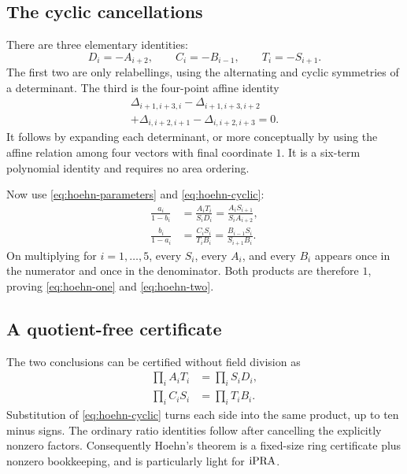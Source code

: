 \subsection{The cyclic cancellations}

There are three elementary identities:
\begin{equation}\label{eq:hoehn-cyclic}
 D_i=-A_{i+2},
 \qquad C_i=-B_{i-1},
 \qquad T_i=-S_{i+1}.
\end{equation}
The first two are only relabellings, using the alternating and cyclic
symmetries of a determinant.  The third is the four-point affine identity
\begin{multline*}
 \Delta_{i+1,i+3,i}-\Delta_{i+1,i+3,i+2}\\
 +\Delta_{i,i+2,i+1}-\Delta_{i,i+2,i+3}=0.
\end{multline*}
It follows by expanding each determinant, or more conceptually by using the
affine relation among four vectors with final coordinate $1$.  It is a
six-term polynomial identity and requires no area ordering.

Now use \eqref{eq:hoehn-parameters} and \eqref{eq:hoehn-cyclic}:
\begin{align*}
 \frac{a_i}{1-b_i}
 &=\frac{A_iT_i}{S_iD_i}
 =\frac{A_iS_{i+1}}{S_iA_{i+2}},\\
 \frac{b_i}{1-a_i}
 &=\frac{C_iS_i}{T_iB_i}
 =\frac{B_{i-1}S_i}{S_{i+1}B_i}.
\end{align*}
On multiplying for $i=1,\ldots,5$, every $S_i$, every $A_i$, and every $B_i$
appears once in the numerator and once in the denominator.  Both products are
therefore $1$, proving \eqref{eq:hoehn-one} and \eqref{eq:hoehn-two}.

\subsection{A quotient-free certificate}

The two conclusions can be certified without field division as
\begin{align*}
 \prod_i A_iT_i&=\prod_i S_iD_i,\\
 \prod_i C_iS_i&=\prod_i T_iB_i.
\end{align*}
Substitution of \eqref{eq:hoehn-cyclic} turns each side into the same product,
up to ten minus signs.  The ordinary ratio identities follow after cancelling
the explicitly nonzero factors.  Consequently Hoehn's theorem is a fixed-size
ring certificate plus nonzero bookkeeping, and is particularly light for
$\mathrm{iPRA}$.
